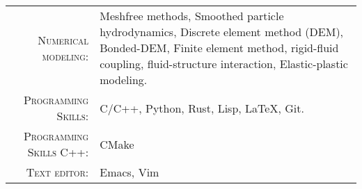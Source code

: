 %
%



\renewcommand{\arraystretch}{1.1}

    \begin{tabular}{>{}r>{}p{13cm}}
      \textsc{Numerical modeling:} & Meshfree methods, Smoothed particle hydrodynamics,
                                     Discrete element method (DEM), Bonded-DEM,
                                     Finite element method, rigid-fluid coupling,
                                     fluid-structure interaction,
                                     Elastic-plastic modeling.\\

      \textsc{Programming Skills:}    &  C/C++, Python, Rust, Lisp, \LaTeX, Git.\\

      \textsc{Programming Skills C++:}  &  CMake\\

      \textsc{Text editor:}    &  Emacs, Vim
    \end{tabular}
